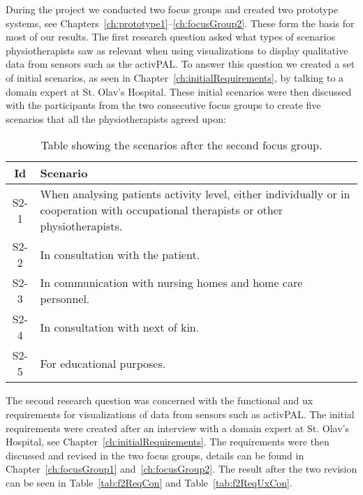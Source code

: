 During the project we conducted two focus groups and created two prototype systems, see Chapters~\ref{ch:prototype1}--\ref{ch:focusGroup2}. These form the basis for most of our results. The first research question asked what types of scenarios physiotherapists saw as relevant when using visualizations to display qualitative data from sensors such as the activPAL. To answer this question we created a set of initial scenarios, as seen in Chapter~\ref{ch:initialRequirements}, by talking to a domain expert at St. Olav's Hospital. These initial scenarios were then discussed with the participants from the two consecutive focus groups to create five scenarios that all the physiotherapists agreed upon:
\begin{table}[h!]
  \begin{tabular}{|c|p{10cm}|}
    \hline
    \textbf{Id} & \textbf{Scenario} \\ \hline
    S2-1 & When analysing patients activity level, either individually or in cooperation with occupational therapists or other physiotherapists. \\ \hline
    S2-2 & In consultation with the patient. \\ \hline
    S2-3 & In communication with nursing homes and home care personnel. \\ \hline
    S2-4 & In consultation with next of kin. \\ \hline
    S2-5 & For educational purposes. \\ \hline
  \end{tabular}
  \caption{Table showing the scenarios after the second focus group.}
\end{table}

The second research question was concerned with the functional and \gls{ux} requirements for visualizations of data from sensors such as activPAL. The initial requirements were created after an interview with a domain expert at St. Olav's Hospital, see Chapter~\ref{ch:initialRequirements}. The requirements were then discussed and revised in the two focus groups, details can be found in Chapter~\ref{ch:focusGroup1} and~\ref{ch:focusGroup2}. The result after the two revision can be seen in Table~\ref{tab:f2ReqCon} and Table~\ref{tab:f2ReqUxCon}.

